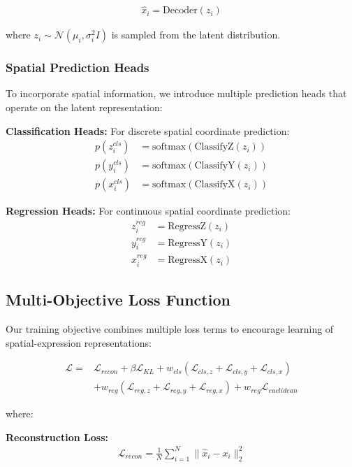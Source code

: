 \documentclass[11pt]{article}
\begin{document}
\begin{align}
\hat{x}_i = \text{Decoder}(z_i)
\end{align}

where $z_i \sim \mathcal{N}(\mu_i, \sigma^2_i I)$ is sampled from the latent distribution.

\subsubsection{Spatial Prediction Heads}

To incorporate spatial information, we introduce multiple prediction heads that operate on the latent representation:

\textbf{Classification Heads:} For discrete spatial coordinate prediction:
\begin{align}
p(z^{cls}_i) &= \text{softmax}(\text{ClassifyZ}(z_i)) \\
p(y^{cls}_i) &= \text{softmax}(\text{ClassifyY}(z_i)) \\
p(x^{cls}_i) &= \text{softmax}(\text{ClassifyX}(z_i))
\end{align}

\textbf{Regression Heads:} For continuous spatial coordinate prediction:
\begin{align}
z^{reg}_i &= \text{RegressZ}(z_i) \\
y^{reg}_i &= \text{RegressY}(z_i) \\
x^{reg}_i &= \text{RegressX}(z_i)
\end{align}

\subsection{Multi-Objective Loss Function}

Our training objective combines multiple loss terms to encourage learning of spatial-expression representations:

\begin{align}
\mathcal{L} = &\mathcal{L}_{recon} + \beta \mathcal{L}_{KL} + w_{cls}(\mathcal{L}_{cls,z} + \mathcal{L}_{cls,y} + \mathcal{L}_{cls,x}) \nonumber \\
&+ w_{reg}(\mathcal{L}_{reg,z} + \mathcal{L}_{reg,y} + \mathcal{L}_{reg,x}) + w_{reg} \mathcal{L}_{euclidean}
\end{align}

where:

\textbf{Reconstruction Loss:}
\begin{align}
\mathcal{L}_{recon} = \frac{1}{N} \sum_{i=1}^N \|\hat{x}_i - x_i\|_2^2
\end{align}
\end{document}
